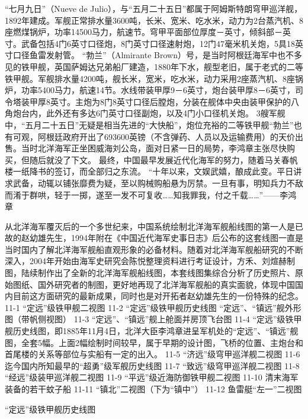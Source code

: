 \documentclass[12pt,UTF8]{ctexbook}
\begin{document}
“七月九日”（Nueve de Julio），与“五月二十五日”都属于阿姆斯特朗穹甲巡洋舰，1892年建成。军舰正常排水量3600吨，长米、宽米、吃水米，动力为2台蒸汽机、8座燃煤锅炉，功率14500马力，航速节。穹甲平面部位厚度－英寸，倾斜部－英寸。武备包括4门6英寸口径炮，8门英寸口径速射炮，12门47毫米机关炮，5具18英寸口径鱼雷发射管。
“勃兰”（Almirante Brown）号，是当时阿根廷海军中也不多见的铁甲舰，英国萨姆达兄弟船厂建造，1880年下水，舰型老旧，属于老式的二等铁甲舰。军舰排水量4200吨，舰长米，宽米，吃水米，动力采用2座蒸汽机、8座锅炉，功率5400马力，航速14节。水线带装甲厚9－6英寸，炮台装甲厚8－6英寸，司令塔装甲厚8英寸。主炮为8门8英寸口径后膛炮，分装在舰体中央由装甲保护的八角炮台内，此外还有多达6门英寸口径副炮，以及4门小口径机关炮。
3艘军舰中，“五月二十五日”无疑是相当先进的“大快船”，炮位充裕的二等铁甲舰“勃兰”也有可观，阿根廷政府开出了693600英镑（不含弹药、人员以及运输费用）的天价出售。当时北洋海军正坐困威海刘公岛，面对日紧一日的局势，李鸿章主张尽快购买，但随后就没了下文。
最终，中国最早发展近代化海军的努力，随着马关春帆楼一纸降书的签订，而全部归之东流。
“十年以来，文娱武嬉，酿成此变。平日讲求武备，动辄以铺张靡费为疑，至以购械购船悬为厉禁。一旦有事，明知兵力不敌而淆于群哄，轻于一掷，遂至一发不可复收……知我罪我，付之千载……”——李鸿章






从北洋海军覆灭后的一个多世纪来，中国系统绘制北洋海军舰船线图的第一人是已故的赵幼雄先生，1994年附在《中国近代海军史事日志》后公布的这套线图一直是当时国内了解北洋海军舰船直观形象的必备材料。随着对北洋海军舰船研究的不断深入，2004年开始由海军史研究会陈悦整理资料进行考证设计，方禾、刘煊赫制图，陆续制作出了全新的北洋海军舰船线图，本套线图集综合分析了历史照片、原始图纸、国外研究者的制图，更好地再现了北洋海军舰船的真实面貌，体现中国国内目前这方面研究的最新成果，同时也是对开拓者赵幼雄先生的一份特殊的纪念。
11-1 “定远”级铁甲舰二视图
11-2 “定远”级铁甲舰历史线图
“定远”、“镇远”舰外形图（带帆侧视图）
11-3 “定远”、“镇远”舰上舱面并房顶飞台图
11-4 “定远”级铁甲舰历史线图，即1885年11月4日，北洋大臣李鸿章进呈军机处的“定远”、“镇远”舰图，全套5幅。上面2幅绘制时间较早，属于早期的设计图，飞桥的位置、主炮台和首尾楼的关系等部位与实船有一定的出入。
11-5 “济远”级穹甲巡洋舰二视图
11-6 迄今国内所知最早的“超勇”级军舰历史线图
11-7 “致远”级穹甲巡洋舰二视图
11-8 “经远”级装甲巡洋舰二视图
11-9 “平远”级近海防御铁甲舰二视图
11-10 清末海军装备的若干蚊子船
11-11 “镇北”二视图（下为“镇中”）
11-12 鱼雷艇“左一”二视图




“定远”级铁甲舰历史线图
\end{document}
